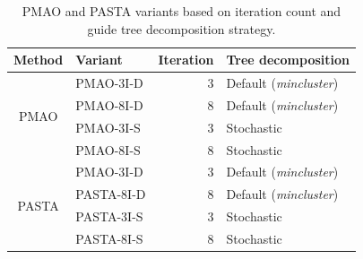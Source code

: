 \begin{table}[!htbp]
  \centering
  \caption{PMAO and PASTA variants based on iteration count and guide tree decomposition strategy.}
    \begin{tabular}{c|l|r|l}
    \multicolumn{1}{l|}{Method} & Variant & \multicolumn{1}{l|}{Iteration} & Tree decomposition\\
    \hline
    \multirow{4}{*}{PMAO} & PMAO-3I-D  & 3     & Default (\textit{mincluster}) \\
	\cline{2-4}          & 	PMAO-8I-D  & 8     & Default (\textit{mincluster}) \\
	\cline{2-4}          & PMAO-3I-S  & 3     & Stochastic \\
	\cline{2-4}          & PMAO-8I-S  & 8     & Stochastic\\
	\hline \hline
	    \multirow{4}{*}{PASTA} & PMAO-3I-D  & 3     & Default (\textit{mincluster}) \\
	\cline{2-4}          & PASTA-8I-D  & 8     & Default (\textit{mincluster}) \\
	\cline{2-4}          & PASTA-3I-S  & 3     & Stochastic \\
	\cline{2-4}          & PASTA-8I-S  & 8     & Stochastic\\
    \hline
    \end{tabular}\label{tab:pmao-variants}\end{table}


